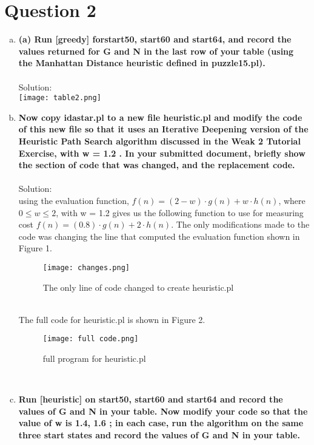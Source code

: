 \documentclass{article}
\newcommand*\fixindent{ \hspace{1pt}\\}
\begin{document}
\section{Question 2}
\begin{enumerate}[a)]
    \item \textbf{(a)	Run [greedy] forstart50, start60 and start64, and record the values returned for G and N in the last row of your table (using the Manhattan Distance heuristic defined in puzzle15.pl).}\fixindent{}\\
    Solution:\\
    \texttt{[image: table2.png]}\\
    
    \item \textbf{Now copy idastar.pl to a new file heuristic.pl and modify the code of this new file so that it uses an Iterative Deepening version of the Heuristic Path Search algorithm discussed in the Weak 2 Tutorial Exercise, with w = 1.2 . In your submitted document, briefly show the section of code that was changed, and the replacement code.}\fixindent{}\\
    Solution:\\
    using the evaluation function, $f(n) = (2 - w) \cdot g(n) + w \cdot h(n)$, where $0 \leq w \leq 2$, with w = 1.2 gives us the following function to use for measuring cost $f(n) = (0.8) \cdot g(n) + 2 \cdot h(n)$. The only modifications made to the code was changing the line that computed the evaluation function shown in Figure 1.\\
    \begin{figure}[h!]
      \begin{center}
            \texttt{[image: changes.png]}
      \end{center}
            \caption{The only line of code changed to create heuristic.pl}
    \end{figure}\\
    The full code for heuristic.pl is shown in Figure 2.
    \begin{figure}[h!]
      \begin{center}
            \texttt{[image: full code.png]}
      \end{center}
            \caption{full program for heuristic.pl}
    \end{figure}\\
    \newpage
    \item \textbf{Run [heuristic] on start50, start60 and start64 and record the values of G and N in your table. Now modify your code so that the value of w is 1.4, 1.6 ; in each case, run the algorithm on the same three start states and record the values of G and N in your table.}\fixindent{}\\

\end{enumerate}
\end{document}
